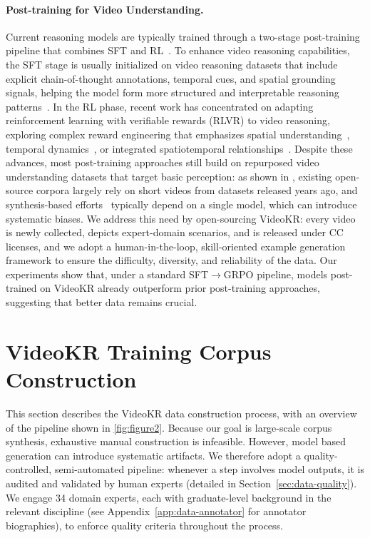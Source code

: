 \documentclass{llmxive}
\providecommand{\data}{VideoKR\xspace}
\providecommand{\ours}{VideoKR\xspace}
\begin{document}
\paragraph{Post-training for Video Understanding.}
Current reasoning models are typically trained through a two-stage post-training pipeline that combines SFT and RL~\cite{guo2025deepseek, team2025kimi, yang2025qwen3, li2025perceptionreasonthinkplan}.
To enhance video reasoning capabilities, the SFT stage is usually initialized on video reasoning datasets that include explicit chain-of-thought annotations, temporal cues, and spatial grounding signals, helping the model form more structured and interpretable reasoning patterns~\cite{videoglamm,videostar,longvitu,feng2025onethinker,wang2025video}.
In the RL phase, recent work has concentrated on adapting reinforcement learning with verifiable rewards (RLVR) to video reasoning, exploring complex reward engineering that emphasizes spatial understanding~\cite{spacer,Tang2025VideoSR}, temporal dynamics~\cite{timer1, TVGR1, videor1, zhao2025videoperceiver}, or integrated spatiotemporal relationships~\cite{Open-o3, Tang2025VideoR4RT}.
Despite these advances, most post-training approaches still build on repurposed video understanding datasets that target basic perception: as shown in , existing open-source corpora largely rely on short videos from datasets released years ago, and synthesis-based efforts~\cite{Zhang2024LLaVAVideoVI, videoespresso} typically depend on a single model, which can introduce systematic biases.
We address this need by open-sourcing \ours: every video is newly collected, depicts expert-domain scenarios, and is released under CC licenses, and we adopt a human-in-the-loop, skill-oriented example generation framework to ensure the difficulty, diversity, and reliability of the data.
Our experiments show that, under a standard SFT$\rightarrow$GRPO pipeline, models post-trained on \ours already outperform prior post-training approaches, suggesting that better data remains crucial.

\section{\data Training Corpus Construction}\label{sec:data}
This section describes the \ours data construction process, with an overview of the pipeline shown in \autoref{fig:figure2}.
Because our goal is large-scale corpus synthesis, exhaustive manual construction is infeasible. However, model based generation can introduce systematic artifacts. We therefore adopt a quality-controlled, semi-automated pipeline: whenever a step involves model outputs, it is audited and validated by human experts (detailed in Section~\ref{sec:data-quality}). We engage 34 domain experts, each with graduate-level background in the relevant discipline (see Appendix~\ref{app:data-annotator} for annotator biographies), to enforce quality criteria throughout the process.
\end{document}
